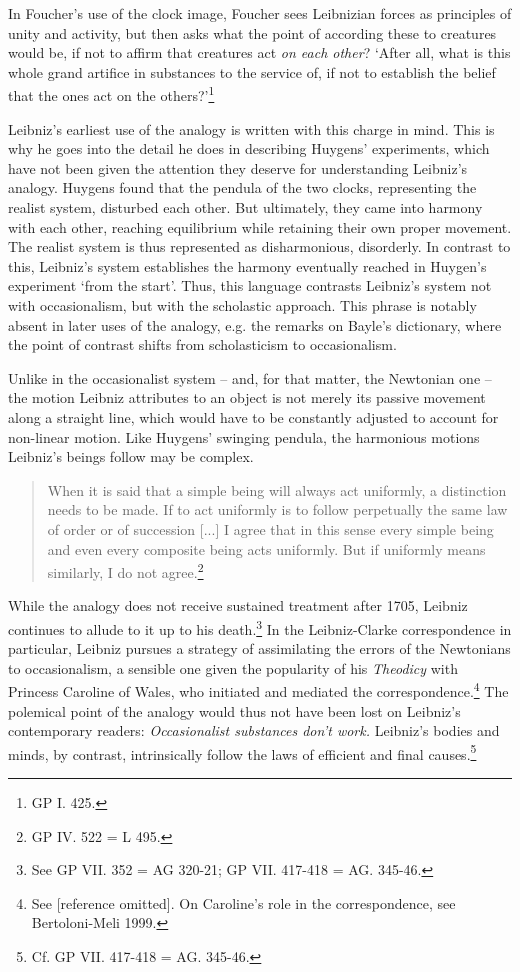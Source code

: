 \documentclass{article}
\begin{document}
In Foucher's use of the clock image, Foucher sees Leibnizian forces as
principles of unity and activity, but then asks what the point of
according these to creatures would be, if not to affirm that creatures
act \emph{on each other}? `After all, what is this whole grand artifice
in substances to the service of, if not to establish the belief that the
ones act on the others?'\footnote{GP I. 425.}

Leibniz's earliest use of the analogy is written with this charge in
mind. This is why he goes into the detail he does in describing Huygens'
experiments, which have not been given the attention they deserve for
understanding Leibniz's analogy. Huygens found that the pendula of the
two clocks, representing the realist system, disturbed each other. But
ultimately, they came into harmony with each other, reaching equilibrium
while retaining their own proper movement. The realist system is thus
represented as disharmonious, disorderly. In contrast to this, Leibniz's
system establishes the harmony eventually reached in Huygen's experiment
`from the start'. Thus, this language contrasts Leibniz's system not
with occasionalism, but with the scholastic approach. This phrase is
notably absent in later uses of the analogy, e.g. the remarks on Bayle's
dictionary, where the point of contrast shifts from scholasticism to
occasionalism.

Unlike in the occasionalist system -- and, for that matter, the
Newtonian one -- the motion Leibniz attributes to an object is not
merely its passive movement along a straight line, which would have to
be constantly adjusted to account for non-linear motion. Like Huygens'
swinging pendula, the harmonious motions Leibniz's beings follow may be
complex.

\begin{quote}
When it is said that a simple being will always act uniformly, a
distinction needs to be made. If to act uniformly is to follow
perpetually the same law of order or of succession {[}...{]} I agree
that in this sense every simple being and even every composite being
acts uniformly. But if uniformly means similarly, I do not
agree.\footnote{GP IV. 522 = L 495.}
\end{quote}

While the analogy does not receive sustained treatment after 1705,
Leibniz continues to allude to it up to his death.\footnote{See GP VII.
  352 = AG 320-21; GP VII. 417-418 = AG. 345-46.} In the Leibniz-Clarke
correspondence in particular, Leibniz pursues a strategy of assimilating
the errors of the Newtonians to occasionalism, a sensible one given the
popularity of his \emph{Theodicy} with Princess Caroline of Wales, who
initiated and mediated the correspondence.\footnote{See {[}reference
  omitted{]}. On Caroline's role in the correspondence, see
  Bertoloni-Meli 1999.} The polemical point of the analogy would thus
not have been lost on Leibniz's contemporary readers:
\emph{Occasionalist substances don't work.} Leibniz's bodies and minds,
by contrast, intrinsically follow the laws of efficient and final
causes.\footnote{Cf. GP VII. 417-418 = AG. 345-46.}
\end{document}
